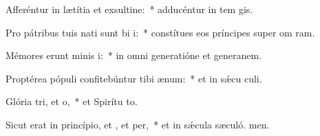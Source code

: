 \item Afferéntur in lætítia et exsultine:~* adducéntur in tem gis.
\item Pro pátribus tuis nati sunt bi i:~* constítues eos príncipes super om ram.
\item Mémores erunt minis i:~* in omni generatióne et generanem.
\item Proptérea pópuli confitebúntur tibi  ænum:~* et in sǽcu culi.
\item Glória tri, et o,~* et Spirítu to.
\item Sicut erat in princípio, et , et per,~* et in sǽcula sæculó. men.
